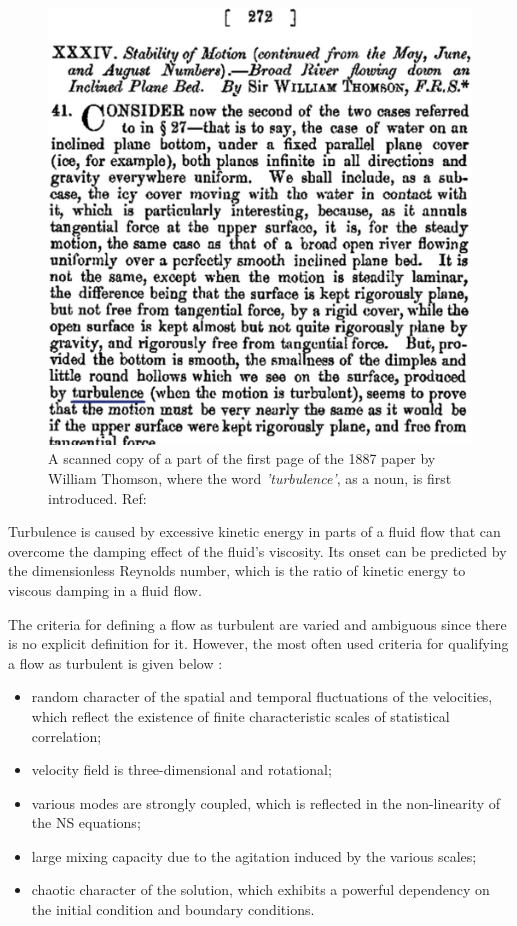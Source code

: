\begin{figure}[h!]
    \centering
    \includegraphics{Figures/research_papers/schmitt2017turbulence-fig-1.jpg}
    \caption{A scanned copy of a part of the first page of the 1887 paper by William Thomson, where the word \textit{'turbulence'}, as a noun, is first introduced. Ref: \parencite{schmitt2017turbulence}}
    \label{fig:schmitt2017turbulence-fig-1}
\end{figure}

Turbulence is caused by excessive kinetic energy in parts of a fluid flow that can overcome the damping effect of the fluid's viscosity. Its onset can be predicted by the dimensionless Reynolds number, which is the ratio of kinetic energy to viscous damping in a fluid flow. 

The criteria for defining a flow as turbulent are varied and ambiguous since there is no explicit definition for it. However, the most often used criteria for qualifying a flow as turbulent is given below \parencite{sagaut2002statistical}:
\begin{itemize}
    \item random character of the spatial and temporal fluctuations of the velocities, which reflect the existence of finite characteristic scales of statistical correlation;
    \item velocity field is three-dimensional and rotational;
    \item various modes are strongly coupled, which is reflected in the non-linearity of the NS equations;
    \item large mixing capacity due to the agitation induced by the various scales;
    \item chaotic character of the solution, which exhibits a powerful dependency on the initial condition and boundary conditions.
\end{itemize}

